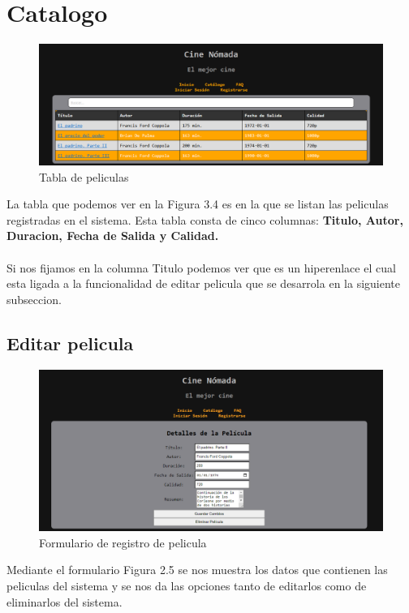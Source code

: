 \documentclass{report}
\begin{document}
            \clearpage
        \section{Catalogo}
            \begin{figure}[h!]
                \centering
                \includegraphics[width=\textwidth]{./img/ui/catalogo.png}
                \caption{Tabla de peliculas}
            \end{figure}  
            La tabla que podemos ver en la Figura 3.4 es en la que se listan las peliculas registradas en el sistema. Esta tabla consta de cinco columnas: \textbf{Titulo, Autor, Duracion, Fecha de Salida y Calidad.} 
            \\\\
            Si nos fijamos en la columna Titulo podemos ver que es un hiperenlace el cual esta ligada a la funcionalidad de editar pelicula que se desarrola en la siguiente subseccion.

            \clearpage
            \subsection{Editar pelicula}
                \begin{figure}[h!]
                    \centering
                    \includegraphics[width=\textwidth]{./img/ui/editarp.png}
                    \caption{Formulario de registro de pelicula}
                \end{figure}
                Mediante el formulario Figura 2.5 se nos muestra los datos que contienen las peliculas del sistema y se nos da las opciones tanto de editarlos como de eliminarlos del sistema.
\end{document}
